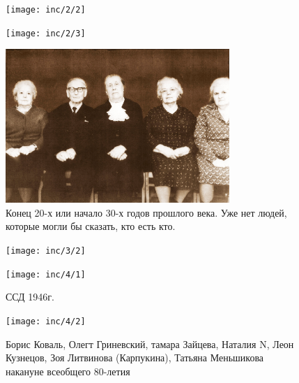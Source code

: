 \vspace{-20pt}
\vfill

\begin{figure}
    \texttt{[image: inc/2/2]}
\end{figure}

\vspace{-20pt}
\vfill
\begin{figure}[h!]
    \texttt{[image: inc/2/3]}
\end{figure}

\restoregeometry

\begin{figure}
    \caption{Конец 20-х или начало 30-х годов прошлого века. Уже нет людей, которые могли бы сказать, кто есть кто.}
    \includegraphics[width=85mm]{inc/3/1}
\end{figure}

\begin{figure}[h!]
    \texttt{[image: inc/3/2]}
\end{figure}

\begin{figure}
    \texttt{[image: inc/4/1]}
    \caption{ССД 1946г.}
\end{figure}

\begin{figure}[h!]
    \texttt{[image: inc/4/2]}
    \caption{Борис Коваль, Олегт Гриневский, тамара Зайцева, Наталия N, Леон Кузнецов, Зоя Литвинова (Карпукина), Татьяна Меньшикова накануне всеобщего 80-летия}
\end{figure}
